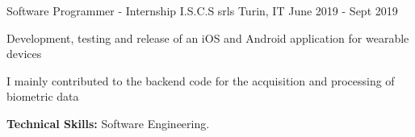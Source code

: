 \begin{cventries}
  \cventry
    {Software Programmer - Internship} %
    {I.S.C.S srls} %
    {Turin, IT} %
    {June 2019 - Sept 2019} %
    {
      \begin{cvitems} %
        \item {Development, testing and release of an iOS and Android application for wearable devices}
        \item {I mainly contributed to the backend code for the acquisition and processing of biometric data}
        \item {\textbf{Technical Skills:} Software Engineering.}
      \end{cvitems}
    }

\end{cventries}

